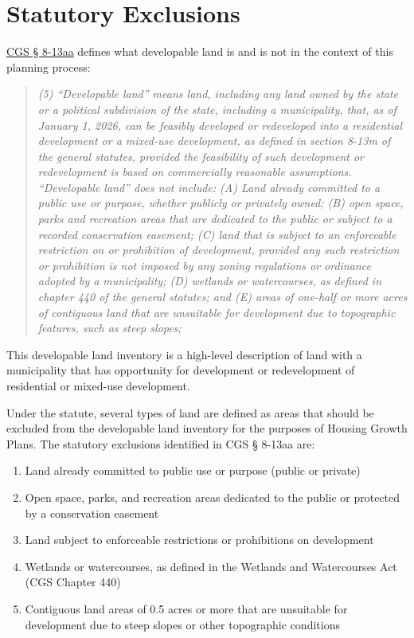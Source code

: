 \documentclass[
  letterpaper,
  DIV=11,
  numbers=noendperiod]{scrreprt}
\providecommand{\tightlist}{%
  \setlength{\itemsep}{0pt}\setlength{\parskip}{0pt}}
\begin{document}

\chapter{Statutory Exclusions}\label{sec-statutory-exclusions}

\href{https://cga.ct.gov/2026/sup/chap_124b.htm\#sec_8-13aa}{CGS §
8-13aa} defines what developable land is and is not in the context of
this planning process:

\begin{quote}
\emph{(5) ``Developable land'' means land, including any land owned by
the state or a political subdivision of the state, including a
municipality, that, as of January 1, 2026, can be feasibly developed or
redeveloped into a residential development or a mixed-use development,
as defined in section 8-13m of the general statutes, provided the
feasibility of such development or redevelopment is based on
commercially reasonable assumptions. ``Developable land'' does not
include: (A) Land already committed to a public use or purpose, whether
publicly or privately owned; (B) open space, parks and recreation areas
that are dedicated to the public or subject to a recorded conservation
easement; (C) land that is subject to an enforceable restriction on or
prohibition of development, provided any such restriction or prohibition
is not imposed by any zoning regulations or ordinance adopted by a
municipality; (D) wetlands or watercourses, as defined in chapter 440 of
the general statutes; and (E) areas of one-half or more acres of
contiguous land that are unsuitable for development due to topographic
features, such as steep slopes;}
\end{quote}

This developable land inventory is a high-level description of land with
a municipality that has opportunity for development or redevelopment of
residential or mixed-use development.

Under the statute, several types of land are defined as areas that
should be excluded from the developable land inventory for the purposes
of Housing Growth Plans. The statutory exclusions identified in CGS §
8-13aa are:

\begin{enumerate}
\def\labelenumi{\Alph{enumi}.}
\tightlist
\item
  Land already committed to public use or purpose (public or private)
\item
  Open space, parks, and recreation areas dedicated to the public or
  protected by a conservation easement
\item
  Land subject to enforceable restrictions or prohibitions on
  development
\item
  Wetlands or watercourses, as defined in the Wetlands and Watercourses
  Act (CGS Chapter 440)
\item
  Contiguous land areas of 0.5 acres or more that are unsuitable for
  development due to steep slopes or other topographic conditions
\end{enumerate}
\end{document}

